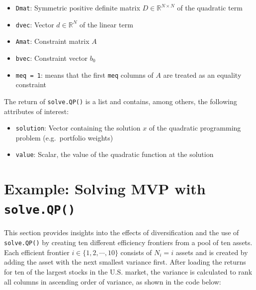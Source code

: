 \documentclass[
  oneside]{book}
\providecommand{\tightlist}{%
  \setlength{\itemsep}{0pt}\setlength{\parskip}{0pt}}
\begin{document}
\vspace{-0.4cm}

\begin{itemize}
\tightlist
\item
  \texttt{Dmat}: Symmetric positive definite matrix \(D \in \mathbb{R}^{N \times N}\) of the quadratic term
\item
  \texttt{dvec}: Vector \(d \in \mathbb{R}^{N}\) of the linear term
\item
  \texttt{Amat}: Constraint matrix \(A\)
\item
  \texttt{bvec}: Constraint vector \(b_0\)
\item
  \texttt{meq\ =\ 1}: means that the first \texttt{meq} columns of \(A\) are treated as an equality constraint
\end{itemize}

The return of \texttt{solve.QP()} is a list and contains, among others, the following attributes of interest:

\vspace{-0.4cm}

\begin{itemize}
\tightlist
\item
  \texttt{solution}: Vector containing the solution \(x\) of the quadratic programming problem (e.g.~portfolio weights)
\item
  \texttt{value}: Scalar, the value of the quadratic function at the solution
\end{itemize}

\hypertarget{exampleanalyticalmvp}{%
\section{\texorpdfstring{Example: Solving MVP with \texttt{solve.QP()}}{Example: Solving MVP with solve.QP()}}\label{exampleanalyticalmvp}}

This section provides insights into the effects of diversification and the use of \texttt{solve.QP()} by creating ten different efficiency frontiers from a pool of ten assets. Each efficient frontier \(i \in \{1, 2, \cdots, 10\}\) consists of \(N_i = i\) assets and is created by adding the asset with the next smallest variance first. After loading the returns for ten of the largest stocks in the U.S. market, the variance is calculated to rank all columns in ascending order of variance, as shown in the code below:
\end{document}
